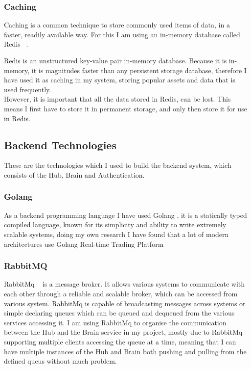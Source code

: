 \documentclass[titlepage]{article}
\begin{document}
\subsubsection{Caching}
Caching is a common technique to store commonly used items of data, in a faster, readily available way. For this I am using an in-memory database called Redis ~\cite{redis}.

Redis is an unstructured key-value pair in-memory database. Because it is in-memory, it is magnitudes faster than any persistent storage database, therefore I have used it as caching in my system, storing popular assets and data that is used frequently. \\
However, it is important that all the data stored in Redis, can be lost. This means I first have to store it in permanent storage, and only then store it for use in Redis. \\

\subsection{Backend Technologies}
These are the technologies which I used to build the backend system, which consists of the Hub, Brain and Authentication. \\

\subsubsection{Golang}
As a backend programming language I have used Golang , it is a statically typed compiled language, known for its simplicity and ability to write extremely scalable systems, doing my own research I have found that a lot of modern architectures use Golang Real-time Trading Platform \\

\subsubsection{RabbitMQ}
RabbitMq ~\cite{rabbitmq} is a message broker. It allows various systems to communicate with each other through a reliable and scalable broker, which can be accessed from various system. RabbitMq is capable of broadcasting messages across systems or simple declaring queues which can be queued and dequeued from the various services accessing it. I am using RabbitMq to organise the communication between the Hub and the Brain service in my project, mostly due to RabbitMq supporting multiple clients accessing the queue at a time, meaning that I can have multiple instances of the Hub and Brain both pushing and pulling from the defined queus without much problem.
\end{document}
